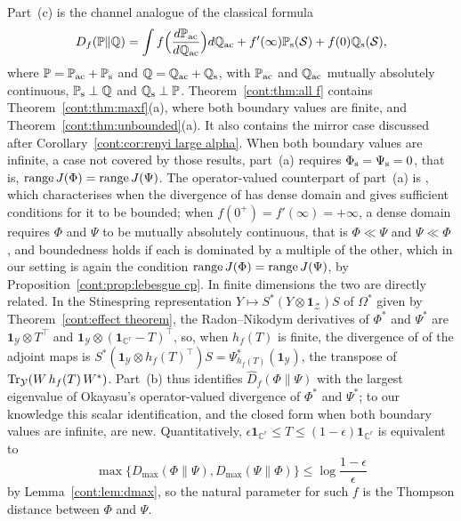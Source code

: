 Part~(c) is the channel analogue of the classical formula \cite{LieseVajda2006}
\[
D_f(\mathbb{P}\|\mathbb{Q})=\int f\Big(\frac{d\mathbb{P}_{\rm ac}}{d\mathbb{Q}_{\rm ac}}\Big)d\mathbb{Q}_{\rm ac}+f'(\infty)\mathbb{P}_{\rm s}(\mathcal{S})+f(0)\mathbb{Q}_{\rm s}(\mathcal{S}),
\]
where $\mathbb{P}=\mathbb{P}_{\rm ac}+\mathbb{P}_{\rm s}$ and $\mathbb{Q}=\mathbb{Q}_{\rm ac}+\mathbb{Q}_{\rm s}$, with $\mathbb{P}_{\rm ac}$ and $\mathbb{Q}_{\rm ac}$ mutually absolutely continuous, $\mathbb{P}_{\rm s}\perp\mathbb{Q}$ and $\mathbb{Q}_{\rm s}\perp\mathbb{P}$.
Theorem~\ref{cont:thm:all f} contains Theorem~\ref{cont:thm:maxf}(a), where both boundary values are finite, and Theorem~\ref{cont:thm:unbounded}(a). It also contains the mirror case discussed after Corollary~\ref{cont:cor:renyi large alpha}. When both boundary values are infinite, a case not covered by those results, part~(a) requires $\Phi_{\rm s}=\Psi_{\rm s}=0$, that is, $\operatorname{range} J(\Phi)=\operatorname{range} J(\Psi)$. The operator-valued counterpart of part~(a) is \cite[Proposition~4.11]{Okayasu2026maxf}, which characterises when the divergence of \cite[Definition~3.1]{Okayasu2026maxf} has dense domain and gives sufficient conditions for it to be bounded; when $f(0^+)=f'(\infty)=+\infty$, a dense domain requires $\Phi$ and $\Psi$ to be mutually absolutely continuous, that is $\Phi\ll\Psi$ and $\Psi\ll\Phi$ \cite[Proposition~4.11(3), Definition~4.10]{Okayasu2026maxf}, and boundedness holds if each is dominated by a multiple of the other, which in our setting is again the condition $\operatorname{range} J(\Phi)=\operatorname{range} J(\Psi)$, by Proposition~\ref{cont:prop:lebesgue cp}. In finite dimensions the two are directly related. In the Stinespring representation $Y\mapsto S^*(Y\otimes\mathbf{1}_{\mathcal{Z}})S$ of $\Omega^*$ given by Theorem~\ref{cont:effect theorem}, the Radon--Nikodym derivatives of $\Phi^*$ and $\Psi^*$ are $\mathbf{1}_{\mathcal{Y}}\otimes T^\top$ and $\mathbf{1}_{\mathcal{Y}}\otimes(\mathbf{1}_{\mathbb{C}^r}-T)^\top$, so, when $h_f(T)$ is finite, the divergence of \cite[Definition~3.1]{Okayasu2026maxf} of the adjoint maps is $S^*(\mathbf{1}_{\mathcal{Y}}\otimes h_f(T)^\top)S=\Psi_{h_f(T)}^*(\mathbf{1}_{\mathcal{Y}})$, the transpose of $\operatorname{Tr}_{\mathcal{Y}}(W\,h_f(T)\,W^*)$. Part~(b) thus identifies $\widehat{D}_f(\Phi\|\Psi)$ with the largest eigenvalue of Okayasu's operator-valued divergence of $\Phi^*$ and $\Psi^*$; to our knowledge this scalar identification, and the closed form when both boundary values are infinite, are new. Quantitatively, $\epsilon\mathbf{1}_{\mathbb{C}^r}\leq T\leq(1-\epsilon)\mathbf{1}_{\mathbb{C}^r}$ is equivalent to
\[
\max\{D_{\max}(\Phi\|\Psi),D_{\max}(\Psi\|\Phi)\}\leq\log\frac{1-\epsilon}{\epsilon}
\]
by Lemma~\ref{cont:lem:dmax}, so the natural parameter for such $f$ is the Thompson distance between $\Phi$ and $\Psi$.

